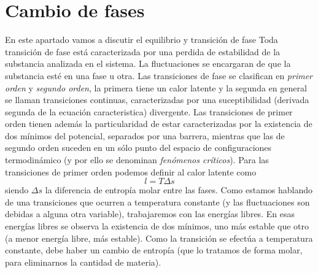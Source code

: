\section{Cambio de fases}
En este apartado vamos a discutir el equilibrio y transición de fase
Toda transición de fase está caracterizada por una perdida de estabilidad de la substancia analizada en el sistema.
La fluctuaciones se encargaran de que la substancia esté en una fase u otra.
Las transiciones de fase se clasifican en \emph{primer orden} y \emph{segundo orden}, la primera tiene un calor latente y la segunda en general se llaman transiciones continuas, caracterizadas por una suceptibilidad (derivada segunda de la ecuación caracteristica) divergente.
Las transiciones de primer orden tienen además la particularidad de estar caracterizadas por la existencia de dos mínimos del potencial, separados por una barrera, mientras que las de segundo orden suceden en un sólo punto del espacio de configuraciones termodinámico (y por ello se denominan \emph{fenómenos críticos}).
Para las transiciones de primer orden podemos definir al calor latente como
\begin{equation}
l = T \Delta s
\end{equation}
siendo $\Delta s$ la diferencia de entropía molar entre las fases.
Como estamos hablando de una transiciones que ocurren a temperatura constante (y las fluctuaciones son debidas a alguna otra variable), trabajaremos con las energías libres.
En esas energías libres se observa la existencia de dos mínimos, uno más estable que otro (a menor energía libre, más estable).
Como la transición se efectúa a temperatura constante, debe haber un cambio de entropía (que lo tratamos de forma molar, para eliminarnos la cantidad de materia).
